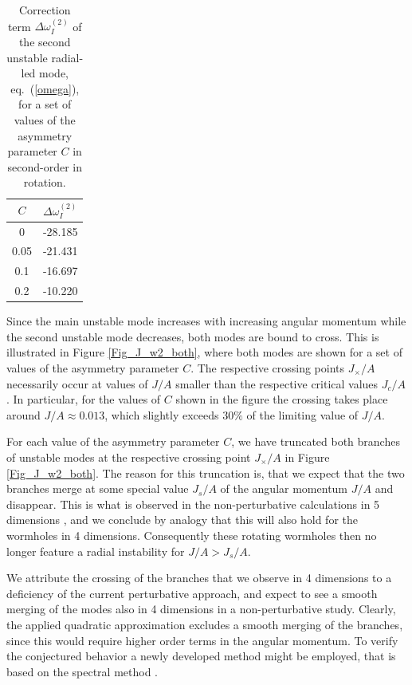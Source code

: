 \documentclass[aps,prd,12pt,superscriptaddress]{revtex4-2}
\begin{document}
\begin{table}[h!]
\begin{center}
\begin{tabular}{ || c | c  || }
 \hline
$C$ &  $\Delta\omega^{(2)}_I$ 
\\ 
  \hline
0  & -28.185
  \\ 
   0.05  & -21.431
  \\ 
   0.1 & -16.697
  \\ 
  0.2 & -10.220
  \\ 
  \hline
\end{tabular}
\end{center}
\caption{Correction term $\Delta \omega_I^{(2)}$ of the second unstable radial-led mode, eq.~(\ref{omega}), for a set of values of the asymmetry parameter $C$ in second-order in rotation.
}
\label{ImOm_coeff_sec}
\end{table}

Since the main unstable mode increases with increasing angular momentum while the second unstable mode decreases, both modes are bound to cross.
This is illustrated in Figure \ref{Fig_J_w2_both}, where both modes are shown for a set of values of the asymmetry parameter $C$.
The respective crossing points $J_\times /A$ necessarily occur at values of $J/A$ smaller than the respective critical values $J_c/A$.
In particular, for the values of $C$ shown in the figure the crossing takes place around $J/A\approx0.013$, which slightly exceeds $30\%$ of the limiting value of $J/A$.

For each value of the asymmetry parameter $C$, we have truncated both branches of unstable modes at the respective crossing point $J_\times /A$ in Figure \ref{Fig_J_w2_both}.
The reason for this truncation is, that we expect that the two branches merge at some special value $J_s/A$ of the angular momentum $J/A$ and disappear.
This is what is observed in the non-perturbative calculations in 5 dimensions \cite{Dzhunushaliev:2013jja}, and we conclude by analogy that this will also hold for the wormholes in 4 dimensions.
Consequently these rotating wormholes then no longer feature a radial instability for $J/A > J_s/A$.
 
We attribute the crossing of the branches that we observe in 4 dimensions to a deficiency of the current perturbative approach, and expect to see a smooth merging of the modes also in 4 dimensions in a non-perturbative study.
Clearly, the applied quadratic approximation excludes a smooth merging of the branches, since this would require higher order terms in the angular momentum.
To verify the conjectured behavior a newly developed method might be employed, that is based on the spectral method \cite{Blazquez-Salcedo:2023hwg,Khoo:2024yeh}.
\end{document}
